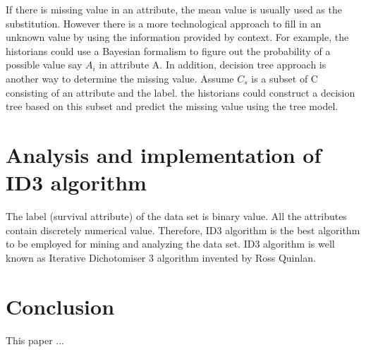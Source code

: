 \documentclass[sigconf]{acmart}
\begin{document}
\par 
If there is missing value in an attribute, the mean value is usually used as the substitution. However there is a more technological approach to fill in an unknown value by using the information provided by context. For example, the historians could use a Bayesian formalism to figure out the probability of a possible value say $A_i$ in attribute A. In addition, decision tree approach is another way to determine the missing value. Assume $C_s$ is a subset of C consisting of an attribute and the label. the historians could construct a decision tree based on this subset and predict the missing value using the tree model.

\section{Analysis and implementation of ID3 algorithm}
The label (survival attribute) of the data set is binary value. All the attributes contain discretely numerical value. Therefore, ID3 algorithm is the best algorithm to be employed for mining and analyzing the data set. ID3 algorithm is well known as Iterative Dichotomiser 3 algorithm invented by Ross Quinlan. 

\section{Conclusion}
This paper ...


 
\end{document}
